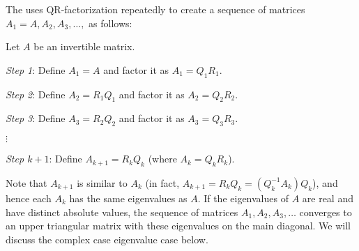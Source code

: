 \documentclass{ximera}
\begin{document}
The  uses QR-factorization repeatedly to create a sequence of matrices $A_{1} =A, A_{2}, A_{3}, \dots,$ as follows:

\begin{algorithm}\label{alg:qrEig}
Let $A$ be an invertible matrix.

\emph{Step 1}: Define $A_{1} = A$ and factor it as $A_{1} = Q_{1}R_{1}$.

\emph{Step 2}: Define $A_{2} = R_{1}Q_{1}$ and factor it as $A_{2} = Q_{2}R_{2}$.

\emph{Step 3}: Define $A_{3} = R_{2}Q_{2}$ and factor it as $A_{3} = Q_{3}R_{3}$.

 $\vdots$
 
\emph{Step $k+1$}: Define $A_{k + 1} = R_{k}Q_{k}$ (where $A_{k} = Q_{k}R_{k}$). 

Note that $A_{k + 1}$ is similar to $A_{k}$ (in fact, $A_{k+1} = R_{k}Q_{k} = (Q_{k}^{-1}A_{k})Q_{k}$), and hence each $A_{k}$ has the same eigenvalues as $A$. If the eigenvalues of $A$ are real and have distinct absolute values, the sequence of matrices $A_{1}, A_{2}, A_{3}, \dots$ converges to an upper triangular matrix with these eigenvalues on the main diagonal. We will discuss the complex case eigenvalue case below.
\end{algorithm}
\end{document}
